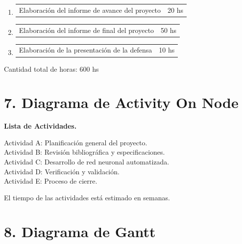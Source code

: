 \documentclass[11pt]{charter}
\begin{document}
\begin{enumerate}
\begin{enumerate}
	\item \begin{tabular}[]{p{11cm} p{2cm}} Elaboración del informe de avance del proyecto 									& 20 hs \end{tabular}
	\item \begin{tabular}[]{p{11cm} p{2cm}} Elaboración del informe de final del proyecto 									& 50 hs \end{tabular}
	\item \begin{tabular}[]{p{11cm} p{2cm}} Elaboración de la presentación de la defensa   									& 10 hs \end{tabular}
	\end{enumerate}
	
\end{enumerate}

Cantidad total de horas: 600 hs

\section*{7. Diagrama de Activity On Node}
\label{sec:AoN}



\vspace{-0.9cm}

\textbf{Lista de Actividades.}

Actividad A: Planificación general del proyecto. \\
Actividad B: Revisión bibliográfica y especificaciones. \\
Actividad C: Desarrollo de red neuronal automatizada. \\
Actividad D: Verificación y validación. \\
Actividad E: Proceso de cierre. 

El tiempo de las actividades está estimado en semanas.

\pagebreak

\section*{8. Diagrama de Gantt}
\label{sec:gantt}
\end{document}
